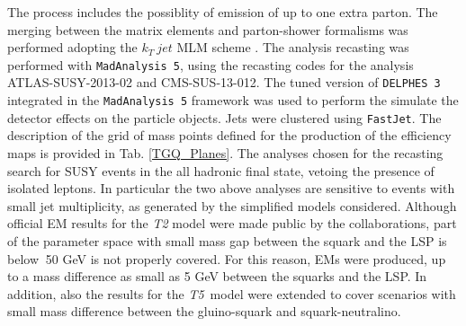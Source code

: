 \documentclass[a4paper,11pt]{article}
\newcommand{\Tfive}{ \textit{T5}}
\begin{document}
%
 The process includes the possiblity of emission of up to one extra parton. The merging between the matrix elements and parton-shower formalisms was performed adopting the $k_T \ jet$ MLM scheme \cite{MLM,Alwall:2007fs}. 
%
The analysis recasting was performed with \texttt{MadAnalysis 5}, using the recasting codes for the analysis ATLAS-SUSY-2013-02\cite{ATLAS-SUSY-2013-02MA5,ATLAS-SUSY-2013-02VALIDATION} and CMS-SUS-13-012\cite{CMS-SUS-13-012MA5,CMS-SUS-13-012VALIDATION}. The tuned version of \texttt{DELPHES 3} integrated in the \texttt{MadAnalysis 5} framework was used to perform the simulate the detector effects on the particle objects. Jets were clustered using \texttt{FastJet}\cite{Cacciari:2011ma}.
%
The description of the grid of mass points defined for the production of the efficiency maps is provided in Tab. \ref{TGQ_Planes}. The analyses chosen for the recasting search for SUSY events in the all hadronic final state, vetoing the presence of isolated leptons. In particular the two above analyses are sensitive to events with small jet multiplicity, as generated by the simplified models considered. Although official EM results for the \textit{T2} model were made public by the collaborations, part of the parameter space with small mass gap between the squark and the LSP is below $~$50 GeV is not properly covered. For this reason, EMs were produced, up to a mass difference as small as 5 GeV between the squarks and the LSP. In addition, also the results for the \Tfive~model were extended to cover scenarios with small mass difference between the gluino-squark and squark-neutralino.
%
\end{document}
